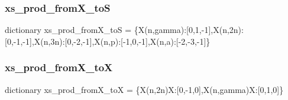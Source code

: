 \subsubsection{\texorpdfstring{xs\+\_\+prod\+\_\+from\+X\+\_\+toS}{xs\_prod\_fromX\_toS}}
{\footnotesize\ttfamily dictionary xs\+\_\+prod\+\_\+from\+X\+\_\+toS = \{\textquotesingle{}X(n,gamma)\textquotesingle{}\+:\mbox{[}0,1,-\/1\mbox{]},\textquotesingle{}X(n,2n)\textquotesingle{}\+:\mbox{[}0,-\/1,-\/1\mbox{]},\textquotesingle{}\+X(n,3n)\textquotesingle{}\+:\mbox{[}0,-\/2,-\/1\mbox{]},\textquotesingle{}\+X(n,p)\textquotesingle{}\+:\mbox{[}-\/1,0,-\/1\mbox{]},\textquotesingle{}\+X(n,a)\textquotesingle{}\+:\mbox{[}-\/2,-\/3,-\/1\mbox{]}\}}

\mbox{\label{namespaceopenbu_1_1data_1_1list__and__dict_a3a0e5e3af6548f64059547e2c0b8c2ac}} 
\subsubsection{\texorpdfstring{xs\+\_\+prod\+\_\+from\+X\+\_\+toX}{xs\_prod\_fromX\_toX}}
{\footnotesize\ttfamily dictionary xs\+\_\+prod\+\_\+from\+X\+\_\+toX = \{\textquotesingle{}X(n,2n)\+X\textquotesingle{}\+:\mbox{[}0,-\/1,0\mbox{]},\textquotesingle{}\+X(n,gamma)\+X\textquotesingle{}\+:\mbox{[}0,1,0\mbox{]}\}}


